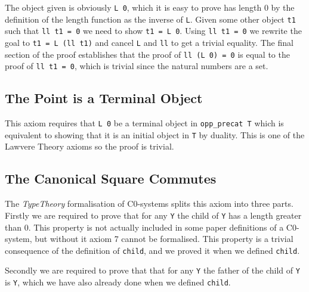 The object given is obviously \lstinline|L 0|, which it is easy to prove has
length 0 by the definition of the length function as the inverse of
\lstinline|L|. Given some other object \lstinline|t1| such that 
\lstinline|ll t1 = 0| we need to show \lstinline|t1 = L 0|. Using 
\lstinline|ll t1 = 0| we rewrite the goal to \lstinline|t1 = L (ll t1)| and
cancel \lstinline|L| and \lstinline|ll| to get a trivial equality. The final
section of the proof establishes that the proof of \lstinline|ll (L 0) = 0| is
equal to the proof of \lstinline|ll t1 = 0|, which is trivial since the
natural numbers are a set.

\subsection{The Point is a Terminal Object}
This axiom requires that \lstinline|L 0| be a terminal object in 
\lstinline|opp_precat T| which is equivalent to showing that it is an initial
object in \lstinline|T| by duality. This is one of the Lawvere Theory axioms so
the proof is trivial.

\subsection{The Canonical Square Commutes}
The \textit{TypeTheory} formalisation of C0-systems splits this axiom into three
parts. Firstly we are required to prove that for any \lstinline|Y| the child of
\lstinline|Y| has a length greater than 0. This property is not actually
included in some paper definitions of a C0-system, but without it axiom 7 cannot
be formalised. This property is a trivial consequence of the definition of
\lstinline|child|, and we proved it when we defined \lstinline|child|.

Secondly we are required to prove that that for any \lstinline|Y| the father of
the child of \lstinline|Y| is \lstinline|Y|, which we have also already done
when we defined \lstinline|child|.

